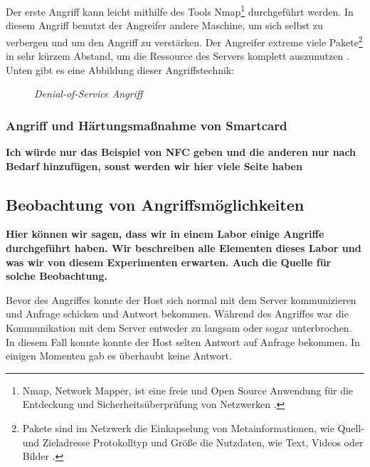 Der erste Angriff kann leicht mithilfe des Tools Nmap\footnote{Nmap, Network Mapper, ist eine freie und Open Source Anwendung
für die Entdeckung und Sicherheitsüberprüfung von Netzwerken \cite{refst:nmap}.} durchgeführt werden. In diesem Angriff benutzt
der Angreifer andere Maschine, um sich selbst zu verbergen und um den Angriff zu verstärken. Der Angreifer extreme viele
Pakete\footnote{Pakete sind im Netzwerk die Einkapselung von Metainformationen, wie Quell- und Zieladresse Protokolltyp 
und Größe die Nutzdaten, wie Text, Videos oder Bilder \cite{refbook:SWIS}.} in sehr kürzem Abstand, um die Ressource des 
Servers komplett auszunutzen \cite{refip:KSDD}. Unten gibt es eine Abbildung dieser Angriffstechnik:

\begin{figure}[H]
  \caption{\textit{Denial-of-Service Angriff} \cite{refip:VDSD}}
  \label{fig:VDSD}
\end{figure}


\subsubsection{Angriff und Härtungsmaßnahme von Smartcard}
\textbf{Ich würde nur das Beispiel von NFC geben und die anderen nur nach Bedarf hinzufügen, sonst werden wir hier
viele Seite haben}


\subsection{Beobachtung von Angriffsmöglichkeiten}
\textbf{Hier können wir sagen, dass wir in einem Labor einige Angriffe durchgeführt haben. Wir beschreiben alle Elementen
dieses Labor und was wir von diesem Experimenten erwarten. Auch die Quelle für solche Beobachtung.}

Bevor des Angriffes konnte der Host sich normal mit dem Server kommunizieren und Anfrage schicken und Antwort bekommen.
Während des Angriffes war die Kommunikation mit dem Server entweder zu langsam oder sogar unterbrochen. In diesem Fall
konnte konnte der Host selten Antwort auf Anfrage bekommen. In einigen Momenten gab es überhaubt keine Antwort. 

